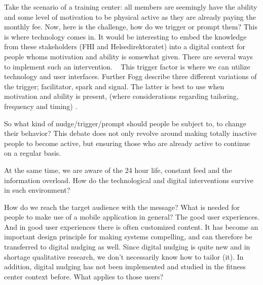 Take the scenario of a training center: all members are seemingly have the ability and some level of motivation to be physical active as they are already paying the monthly fee. Now, here is the challenge, how do we trigger or prompt them? This is where technology comes in. It would be interesting to embed the knowledge from these stakeholders (FHI and Helsedirektoratet) into a digital context for people whoms motivation and ability is somewhat given. There are several ways to implement such an intervention. 
 
This trigger factor is where we can utilize technology and user interfaces. Further Fogg describe three different variations of the trigger; facilitator, spark and signal. The latter is best to use when motivation and ability is present, (where considerations regarding tailoring, frequency and timing) \cite{fogg_persuasive_2003}.


So what kind of nudge/trigger/prompt should people be subject to, to change their behavior? This debate does not only revolve around making totally inactive people to become active, but ensuring those who are already active to continue on a regular basis. 

At the same time, we are aware of the 24 hour life, constant feed and the information overload. How do the technological and digital interventions survive in such environment? 

How do we reach the target audience with the message? What is needed for people to make use of a mobile application in general? The good user experiences. And in good user experiences there is often customized content. It has become an important design principle for making systems compelling, and can therefore be transferred to digital nudging as well. Since digital nudging is quite new and in shortage  qualitative research, we don't necessarily know how to tailor (it). In addition, digital nudging has not been implemented and studied in the fitness center context before. What applies to those users?

